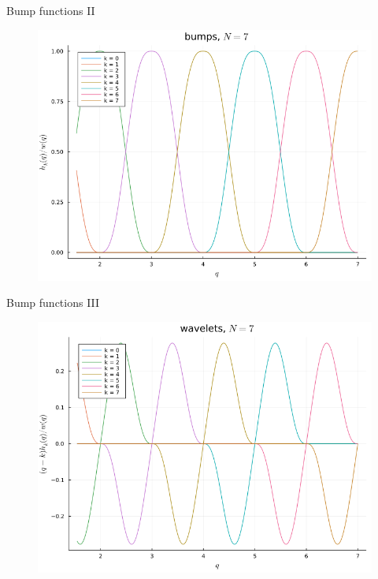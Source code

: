 \documentclass{beamer}
\begin{document}
\begin{frame}{Bump functions II}
    \begin{figure}[H]
        \centering
            \includegraphics[scale=0.33]{img/BUMP/BUMP_hw_N=7.png}
        \label{fig:bumpxy}
    \end{figure}
\end{frame}

\begin{frame}{Bump functions III}
    \begin{figure}[H]
        \centering
            \includegraphics[scale=0.33]{img/BUMP/wavelets_qhw_N=7.png}
        \label{fig:bumpxy}
    \end{figure}
\end{frame}
\end{document}
